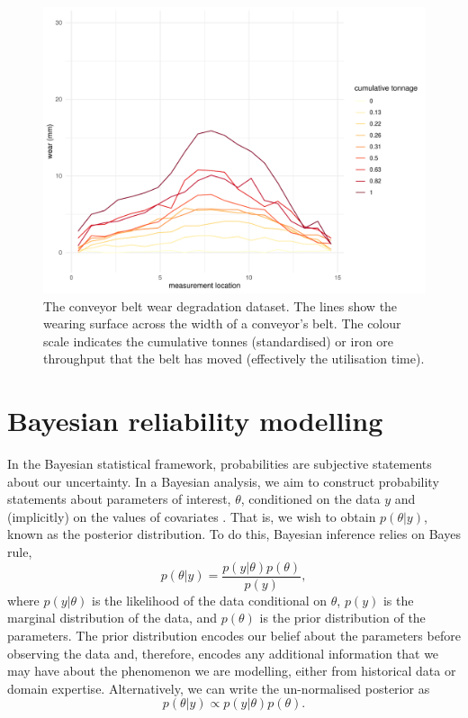 \begin{figure}[h]
  \centering
  \includegraphics[width=1\textwidth]{./figures/ch-1/belt_wear_ut.pdf}
  \caption{The conveyor belt wear degradation dataset. The lines show the wearing surface across the width of a conveyor's belt. The colour scale indicates the cumulative tonnes (standardised) or iron ore throughput that the belt has moved (effectively the utilisation time).}
  \label{fig:belt_wear_ut}
\end{figure}

\section{Bayesian reliability modelling}
\label{sec:Bayesian-methods}

In the Bayesian statistical framework, probabilities are subjective statements about our uncertainty. In a Bayesian analysis, we aim to construct probability statements about parameters of interest, $\theta$, conditioned on the data $y$ and (implicitly) on the values of covariates \citep{BDA2020}. That is, we wish to obtain $p(\theta|y)$, known as the posterior distribution. To do this, Bayesian inference relies on Bayes rule,
\begin{equation}
  p(\theta|y) = \frac{p(y|\theta)p(\theta)}{p(y)},
\end{equation}
where $p(y|\theta)$ is the likelihood of the data conditional on $\theta$, $p(y)$ is the marginal distribution of the data, and $p(\theta)$ is the prior distribution of the parameters. The prior distribution encodes our belief about the parameters before observing the data and, therefore, encodes any additional information that we may have about the phenomenon we are modelling, either from historical data or domain expertise. Alternatively, we can write the un-normalised posterior as
\begin{equation}
  p(\theta|y) \propto p(y|\theta)p(\theta).
\end{equation}

